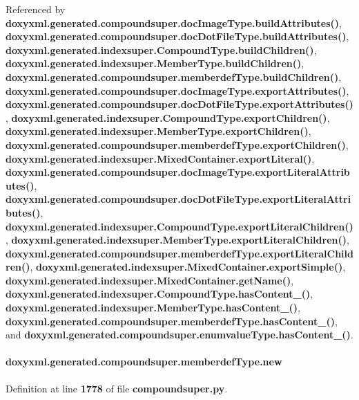 Referenced by {\bf doxyxml.\+generated.\+compoundsuper.\+doc\+Image\+Type.\+build\+Attributes()}, {\bf doxyxml.\+generated.\+compoundsuper.\+doc\+Dot\+File\+Type.\+build\+Attributes()}, {\bf doxyxml.\+generated.\+indexsuper.\+Compound\+Type.\+build\+Children()}, {\bf doxyxml.\+generated.\+indexsuper.\+Member\+Type.\+build\+Children()}, {\bf doxyxml.\+generated.\+compoundsuper.\+memberdef\+Type.\+build\+Children()}, {\bf doxyxml.\+generated.\+compoundsuper.\+doc\+Image\+Type.\+export\+Attributes()}, {\bf doxyxml.\+generated.\+compoundsuper.\+doc\+Dot\+File\+Type.\+export\+Attributes()}, {\bf doxyxml.\+generated.\+indexsuper.\+Compound\+Type.\+export\+Children()}, {\bf doxyxml.\+generated.\+indexsuper.\+Member\+Type.\+export\+Children()}, {\bf doxyxml.\+generated.\+compoundsuper.\+memberdef\+Type.\+export\+Children()}, {\bf doxyxml.\+generated.\+indexsuper.\+Mixed\+Container.\+export\+Literal()}, {\bf doxyxml.\+generated.\+compoundsuper.\+doc\+Image\+Type.\+export\+Literal\+Attributes()}, {\bf doxyxml.\+generated.\+compoundsuper.\+doc\+Dot\+File\+Type.\+export\+Literal\+Attributes()}, {\bf doxyxml.\+generated.\+indexsuper.\+Compound\+Type.\+export\+Literal\+Children()}, {\bf doxyxml.\+generated.\+indexsuper.\+Member\+Type.\+export\+Literal\+Children()}, {\bf doxyxml.\+generated.\+compoundsuper.\+memberdef\+Type.\+export\+Literal\+Children()}, {\bf doxyxml.\+generated.\+indexsuper.\+Mixed\+Container.\+export\+Simple()}, {\bf doxyxml.\+generated.\+indexsuper.\+Mixed\+Container.\+get\+Name()}, {\bf doxyxml.\+generated.\+indexsuper.\+Compound\+Type.\+has\+Content\+\_\+()}, {\bf doxyxml.\+generated.\+indexsuper.\+Member\+Type.\+has\+Content\+\_\+()}, {\bf doxyxml.\+generated.\+compoundsuper.\+memberdef\+Type.\+has\+Content\+\_\+()}, and {\bf doxyxml.\+generated.\+compoundsuper.\+enumvalue\+Type.\+has\+Content\+\_\+()}.

\paragraph[{new}]{\setlength{\rightskip}{0pt plus 5cm}doxyxml.\+generated.\+compoundsuper.\+memberdef\+Type.\+new}\label{classdoxyxml_1_1generated_1_1compoundsuper_1_1memberdefType_ac138c51903578bc65ced2f4d76681c74}


Definition at line {\bf 1778} of file {\bf compoundsuper.\+py}.



